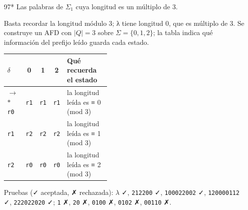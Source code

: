 \documentclass[11pt]{article}
\begin{document}
\begin{ejercicio}{97}{*}
Las palabras de $\Sigma_1$ cuya longitud es un múltiplo de 3.
\end{ejercicio}
\proc Basta recordar la longitud módulo 3; λ tiene longitud 0, que es múltiplo de 3. Se construye un AFD con $|Q| = 3$ sobre $\Sigma = \{0, 1, 2\}$; la tabla indica qué información del prefijo leído guarda cada estado.
\begin{center}\small\begin{tabular}{lcccp{0.42\linewidth}}\toprule
$\delta$ & 0 & 1 & 2 & Qué recuerda el estado \\\midrule
$\to$$*$ \texttt{r0} & \texttt{r1} & \texttt{r1} & \texttt{r1} & la longitud leída es ≡ 0 (mod 3) \\
 \texttt{r1} & \texttt{r2} & \texttt{r2} & \texttt{r2} & la longitud leída es ≡ 1 (mod 3) \\
 \texttt{r2} & \texttt{r0} & \texttt{r0} & \texttt{r0} & la longitud leída es ≡ 2 (mod 3) \\
\bottomrule\end{tabular}\end{center}
Pruebas (✓ aceptada, ✗ rechazada): $\lambda$ ✓, \texttt{212200} ✓, \texttt{100022002} ✓, \texttt{120000112} ✓, \texttt{222022020} ✓; \texttt{1} ✗, \texttt{20} ✗, \texttt{0100} ✗, \texttt{0102} ✗, \texttt{00110} ✗.
\end{document}

